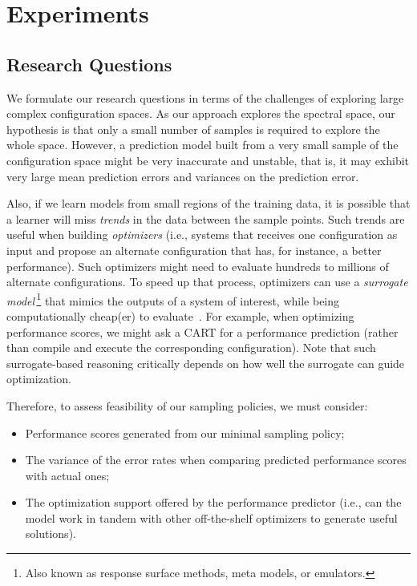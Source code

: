 \section{Experiments}
\label{sec:experiments}



\subsection{Research Questions} 

We formulate our research questions in terms of the challenges of
exploring large complex configuration spaces.
As our approach explores the spectral space, our hypothesis is that only a small
number of samples is required to explore the whole space.
However, a prediction model built from a very small sample of the configuration space might
be very inaccurate and unstable, that is, it may exhibit very large mean prediction errors and variances on the prediction error.

Also, if we learn models from small regions of the training data,
it is  possible that a learner will miss {\em trends} in the data
between the sample points. Such trends are useful when building {\em optimizers}
(i.e., systems that receives one configuration as input and propose an alternate
configuration that has, for instance,  a better performance). Such optimizers might
need to evaluate hundreds to millions of alternate configurations. 
To speed up that process, optimizers can use a {\em surrogate model}\,\footnote{Also known as response surface methods, meta models, or emulators.}
that  mimics the outputs of a system of interest, while being computationally cheap(er) to evaluate~\cite{loshchilov13}. For example, when optimizing
performance scores, we might ask a CART  for a performance
prediction (rather than compile and execute
the corresponding configuration).  Note that such surrogate-based
reasoning critically depends on how well the surrogate can guide optimization.


Therefore, to assess feasibility of our sampling policies, we must consider:
\begin{itemize}
\item Performance scores generated from our minimal sampling policy;
\item The variance of the error rates when comparing predicted performance scores with actual ones;
\item The optimization support offered by the performance predictor (i.e., can the model work in tandem with other off-the-shelf optimizers to generate useful solutions).
\end{itemize}

